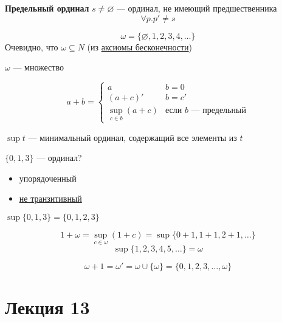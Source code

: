 \documentclass[oneside]{book}
\renewcommand{\leftmark}{}
\begin{document}
\begin{definition}
	\textbf{Предельный ординал} \(s \neq \varnothing\) --- ординал, не имеющий предшественника
	\[ \forall p. p' \neq s \]
	\label{orga4c8f98}
\end{definition}
\begin{examp}
	\[ \omega = \{\varnothing, 1, 2, 3, 4, \dots\} \]
	Очевидно, что \(\omega \subseteq N\) (из \hyperref[orga9a7442]{аксиомы бесконечности})
	\label{orgdbcabeb}
\end{examp}
\begin{theorem}
	\(\omega\) --- множество
	\label{orgda1ccb5}
\end{theorem}
\begin{definition}
	\[ a + b = \begin{cases}
			a                            & b = 0                               \\
			(a + c)'                     & b = c'                              \\
			\sup\limits_{c \in b}(a + c) & \text{если }b\text{ --- предельный}
		\end{cases} \]
	\label{org6c4b139}
\end{definition}
\begin{definition}
	\(\sup t\) --- минимальный ординал, содержащий все элементы из \(t\)
	\label{orga142a6e}
\end{definition}
\begin{examp}
	\(\{0, 1, 3\}\) --- ординал?
	\begin{itemize}
		\item упорядоченный
		\item \uline{не транзитивный}
	\end{itemize}
	\(\sup \{0, 1, 3\} = \{0, 1, 2, 3\}\)
\end{examp}
\begin{examp}
	\[1 + \omega = \sup\limits_{c \in \omega}(1 + c) = \sup \{0 + 1, 1 + 1, 2+ 1, \dots\}\]
	\[ \sup \{1, 2, 3, 4, 5, \dots\} = \omega \]
	\label{org25e17df}
\end{examp}
\begin{examp}
	\[ \omega + 1 = \omega' = \omega \cup \{\omega\} = \{0, 1, 2, 3, \dots, \omega\} \]
	\label{orgff97d29}
\end{examp}
\chapter*{Лекция 13}\renewcommand{\leftmark}{Лекция 13}
\label{sec:org498067b}
\end{document}
